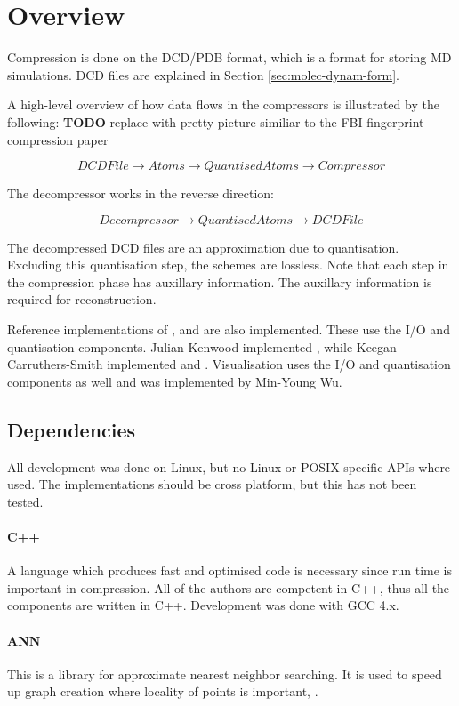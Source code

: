\documentclass[a4paper]{report}
\newcommand{\todo}{\textbf{TODO} }
\begin{document}
\section{Overview}

Compression is done on the DCD/PDB format, which is a format for storing MD
simulations. DCD files are explained in Section \ref{sec:molec-dynam-form}.

A high-level overview of how data flows in the compressors is illustrated by
the following: \todo replace with pretty picture similiar to the FBI
fingerprint compression paper

\[ DCDFile \to Atoms \to QuantisedAtoms \to Compressor \]

The decompressor works in the reverse direction:

\[ Decompressor \to QuantisedAtoms \to DCDFile \]

The decompressed DCD files are an approximation due to quantisation. Excluding
this quantisation step, the schemes are lossless. Note that each step in the
compression phase has auxillary information. The auxillary information is
required for reconstruction.

Reference implementations of \citet{devillers2000gci}, \citet{gumholdcomp} and
\citet{omeltchenko2000sls} are also implemented. These use the I/O and
quantisation components. Julian Kenwood implemented
\citet{omeltchenko2000sls}, while Keegan Carruthers-Smith implemented
\citet{devillers2000gci} and \citet{gumholdcomp}. Visualisation uses the I/O
and quantisation components as well and was implemented by Min-Young Wu.


\subsection{Dependencies}

All development was done on Linux, but no Linux or POSIX specific APIs where
used. The implementations should be cross platform, but this has not been
tested.

\paragraph{C++}
A language which produces fast and optimised code is necessary since run time
is important in compression. All of the authors are competent in C++, thus all
the components are written in C++. Development was done with GCC 4.x.

\paragraph{ANN}
This is a library for approximate nearest neighbor searching. It is used to
speed up graph creation where locality of points is important, \citep{ann}.
\end{document}
